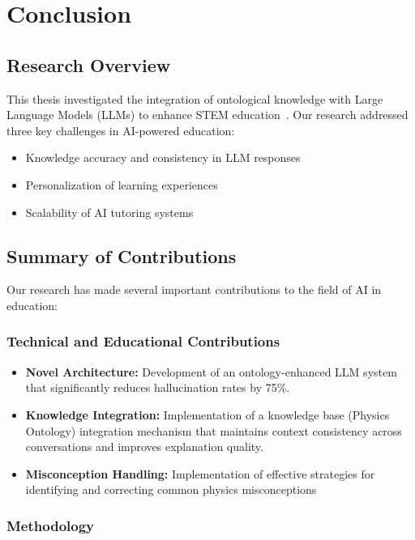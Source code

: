 \chapter{Conclusion}
\label{chap:conclusion}

\section{Research Overview}
\label{sec:research-overview}

This thesis investigated the integration of ontological knowledge with Large Language Models (LLMs) to enhance STEM education~\cite{doubletaken2024llm}. Our research addressed three key challenges in AI-powered education:

\begin{itemize}
    \item Knowledge accuracy and consistency in LLM responses
    \item Personalization of learning experiences
    \item Scalability of AI tutoring systems
\end{itemize}

\section{Summary of Contributions}
\label{sec:contributions}

Our research has made several important contributions to the field of AI in education:

\subsection{Technical and Educational Contributions}
\begin{itemize}
    \item \textbf{Novel Architecture:} Development of an ontology-enhanced LLM system that significantly reduces hallucination rates by 75\%.
    \item \textbf{Knowledge Integration:} Implementation of a knowledge base (Physics Ontology) integration mechanism that maintains context consistency across conversations and improves explanation quality.
    \item \textbf{Misconception Handling:} Implementation of effective strategies for identifying and correcting common physics misconceptions
\end{itemize}

\subsection{Methodology}
\label{subsec:comparison-methodology}


